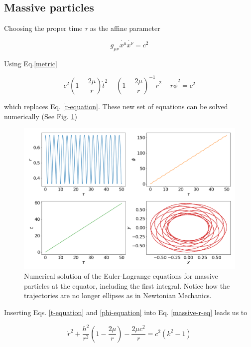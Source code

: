 \documentclass[letterpaper,11pt,onecolumn]{article}
\begin{document}
\subsection{Massive particles} \label{massive}

Choosing the proper time $\tau$ as the affine parameter 

\begin{equation*}
    g_{\mu \nu} \dot{x^\mu} \dot{x^\nu} = c^2
\end{equation*}

Using Eq.\ref{metric} 

\begin{equation} \label{massive-r-eq}
    c^2 \left( 1 - \frac{2 \mu}{r} \right) \dot{t}^2  - \left( 1 - \frac{2 \mu}{r} \right)^{-1} \dot{r}^2 - r\dot{\phi}^2  = c^2
\end{equation}

which replaces Eq. \ref{r-equation}. These new set of equations can be solved numerically (See Fig. \ref{fig:massive-set})


\begin{figure}[h!]
    \centering
    \includegraphics[width=0.8\linewidth]{Presentations/Images/2_first_orbits.png}
    \caption{Numerical solution of the Euler-Lagrange equations for massive particles at the equator, including the first integral. Notice how the trajectories are no longer ellipses as in Newtonian Mechanics. }
    \label{fig:massive-set}
\end{figure}


Inserting Eqs. \ref{t-equation} and \ref{phi-equation} into Eq. \ref{massive-r-eq} leads us to 

\begin{equation} \label{massive-r-tau}
    \dot{r}^2 + \frac{h^2}{r^2} \left( 1 - \frac{2\mu}{r}\right) - \frac{2\mu c^2}{r} = c^2 (k^2 - 1)
\end{equation}
\end{document}
